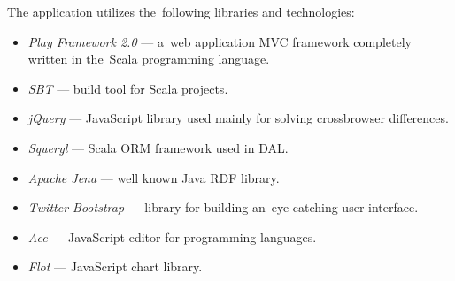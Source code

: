 The application utilizes the~following libraries and technologies:
\begin{itemize}
  \item \emph{Play Framework 2.0} --- a~web application MVC framework completely written 
  in the~Scala programming language.
  \item \emph{SBT} --- build tool for Scala projects.
  \item \emph{jQuery} --- JavaScript library used mainly for solving crossbrowser 
  differences.
  \item \emph{Squeryl} --- Scala ORM framework used in DAL.
  \item \emph{Apache Jena} --- well known Java RDF library.
  \item \emph{Twitter Bootstrap} --- library for building an~eye-catching user 
  interface.
  \item \emph{Ace} --- JavaScript editor for programming languages.
  \item \emph{Flot} --- JavaScript chart library.
\end{itemize}

